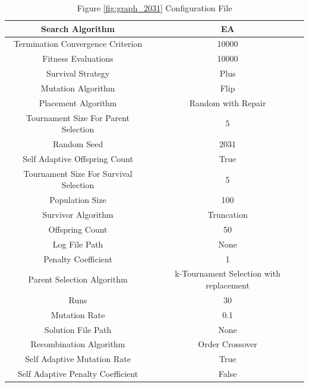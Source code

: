 \documentclass{standalone}
\begin{document}
\clearpage
\begin{table}[!htb]
	\centering
	\caption{Figure \ref{fig:graph_2031} Configuration File}
	\label{tab:graph_2031}
	\begin{tabular}{| c | c |}
		\hline
		Search Algorithm		& EA		 \\
		\hline
		Termination Convergence Criterion		& 10000		 \\
		\hline
		Fitness Evaluations		& 10000		 \\
		\hline
		Survival Strategy		& Plus		 \\
		\hline
		Mutation Algorithm		& Flip		 \\
		\hline
		Placement Algorithm		& Random with Repair		 \\
		\hline
		Tournament Size For Parent Selection		& 5		 \\
		\hline
		Random Seed		& 2031		 \\
		\hline
		Self Adaptive Offspring Count		& True		 \\
		\hline
		Tournament Size For Survival Selection		& 5		 \\
		\hline
		Population Size		& 100		 \\
		\hline
		Survivor Algorithm		& Truncation		 \\
		\hline
		Offspring Count		& 50		 \\
		\hline
		Log File Path		& None		 \\
		\hline
		Penalty Coefficient		& 1		 \\
		\hline
		Parent Selection Algorithm		& k-Tournament Selection with replacement		 \\
		\hline
		Runs		& 30		 \\
		\hline
		Mutation Rate		& 0.1		 \\
		\hline
		Solution File Path		& None		 \\
		\hline
		Recombination Algorithm		& Order Crossover		 \\
		\hline
		Self Adaptive Mutation Rate		& True		 \\
		\hline
		Self Adaptive Penalty Coefficient		& False		 \\
		\hline
	\end{tabular}
\end{table}
\end{document}
